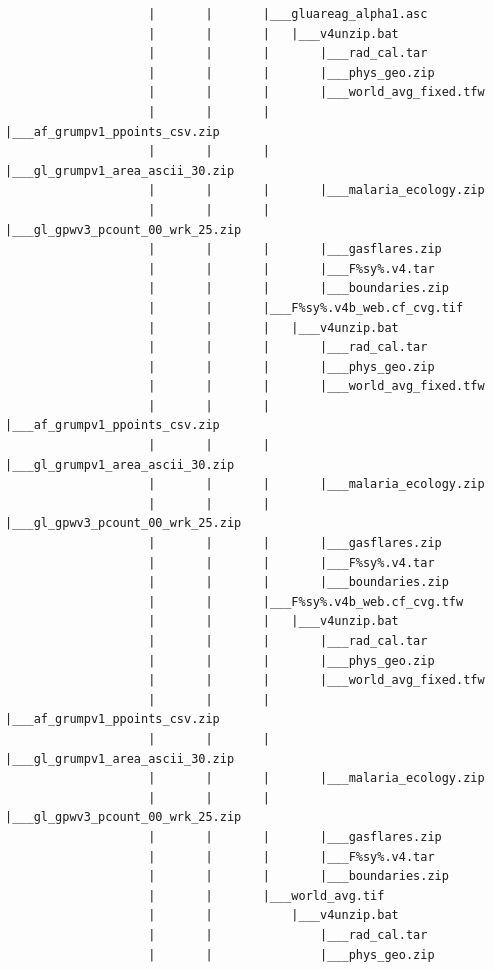 \documentclass[
]{book}
\begin{document}
\begin{verbatim}
                    |       |       |___gluareag_alpha1.asc
                    |       |       |   |___v4unzip.bat
                    |       |       |       |___rad_cal.tar
                    |       |       |       |___phys_geo.zip
                    |       |       |       |___world_avg_fixed.tfw
                    |       |       |       |___af_grumpv1_ppoints_csv.zip
                    |       |       |       |___gl_grumpv1_area_ascii_30.zip
                    |       |       |       |___malaria_ecology.zip
                    |       |       |       |___gl_gpwv3_pcount_00_wrk_25.zip
                    |       |       |       |___gasflares.zip
                    |       |       |       |___F%sy%.v4.tar
                    |       |       |       |___boundaries.zip
                    |       |       |___F%sy%.v4b_web.cf_cvg.tif
                    |       |       |   |___v4unzip.bat
                    |       |       |       |___rad_cal.tar
                    |       |       |       |___phys_geo.zip
                    |       |       |       |___world_avg_fixed.tfw
                    |       |       |       |___af_grumpv1_ppoints_csv.zip
                    |       |       |       |___gl_grumpv1_area_ascii_30.zip
                    |       |       |       |___malaria_ecology.zip
                    |       |       |       |___gl_gpwv3_pcount_00_wrk_25.zip
                    |       |       |       |___gasflares.zip
                    |       |       |       |___F%sy%.v4.tar
                    |       |       |       |___boundaries.zip
                    |       |       |___F%sy%.v4b_web.cf_cvg.tfw
                    |       |       |   |___v4unzip.bat
                    |       |       |       |___rad_cal.tar
                    |       |       |       |___phys_geo.zip
                    |       |       |       |___world_avg_fixed.tfw
                    |       |       |       |___af_grumpv1_ppoints_csv.zip
                    |       |       |       |___gl_grumpv1_area_ascii_30.zip
                    |       |       |       |___malaria_ecology.zip
                    |       |       |       |___gl_gpwv3_pcount_00_wrk_25.zip
                    |       |       |       |___gasflares.zip
                    |       |       |       |___F%sy%.v4.tar
                    |       |       |       |___boundaries.zip
                    |       |       |___world_avg.tif
                    |       |           |___v4unzip.bat
                    |       |               |___rad_cal.tar
                    |       |               |___phys_geo.zip

\end{verbatim}
\end{document}
